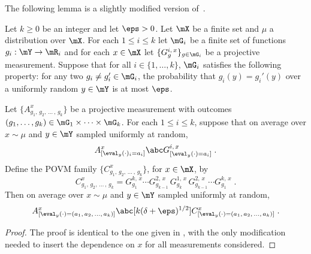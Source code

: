 The following lemma is a slightly modified version of~\cite[Fact~4.34]{NW19}.
\begin{lemma}\label{lem:ld-sandwich}
  Let $k \geq 0$ be an integer and let $\eps>0$.
  Let $\mX$ be a finite set and $\mu$ a distribution over $\mX$.
  For each $1 \leq i \leq k$ let $\mG_i$ be a finite set of functions $g_i : \mY
  \rightarrow \mR_i$ and for each $x \in \mX$ let $\{G^{i,\, x}_g\}_{g\in
    \mG_i}$ be a projective measurement.
  Suppose that for all $i\in \{1,\ldots,k\}$, $\mG_i$ satisfies the following
  property: for any two $g_i \neq g_i' \in \mG_i$, the probability that $g_i(y)
  = g_i'(y)$ over a uniformly random $y \in \mY$ is at most $\eps$.

  Let $\bigl\{ A^{x}_{g_1,\, g_2,\, \ldots\,,\, g_k} \bigr\}$ be a projective
  measurement with outcomes $(g_1,\ldots,g_k) \in \mG_1\times\cdots\times
  \mG_k$.
  For each $1 \leq i \leq k$, suppose that on average over $x \sim \mu$ and
  $y\in \mY$ sampled uniformly at random,
  \begin{equation}\label{eq:ld-sandwich-1}
    A^{x}_{[\eval_y(\cdot)_i = a_i]} \abc G^{i,\, x}_{[\eval_y(\cdot)=a_i]}\;.
  \end{equation}
  Define the POVM family $\{C^x_{g_1,\, g_2,\, \ldots\,,\, g_k}\}$, for $x\in \mX$, by
  \begin{equation*}
    C^x_{g_1,\, g_2,\, \ldots\,,\, g_k} = G^{k,\, x}_{g_1} \cdots
    G^{2,\, x}_{g_{k-1}} \, G^{1,\, x}_{g_k} \, G^{2,\, x}_{g_{k-1}} \cdots
    G^{k,\, x}_{g_1}\;.
  \end{equation*}
  Then on average over $x\sim \mu$ and $y\in \mY$ sampled uniformly at random,
  \begin{equation}\label{eq:ld-sandwich-2}
    A^x_{[\eval_y(\cdot) = (a_1,\, a_2,\, \ldots,\, a_k)]} \abc[k(\delta+\eps)^{1/2}]
    C^x_{[\eval_y(\cdot) = (a_1,\, a_2,\, \ldots,\, a_k)]}\;.
\end{equation}
\end{lemma}

\begin{proof}
  The proof is identical to the one given in \cite[Fact~4.34]{NW19}, with the
  only modification needed to insert the dependence on $x$ for all measurements
  considered.
\end{proof}


